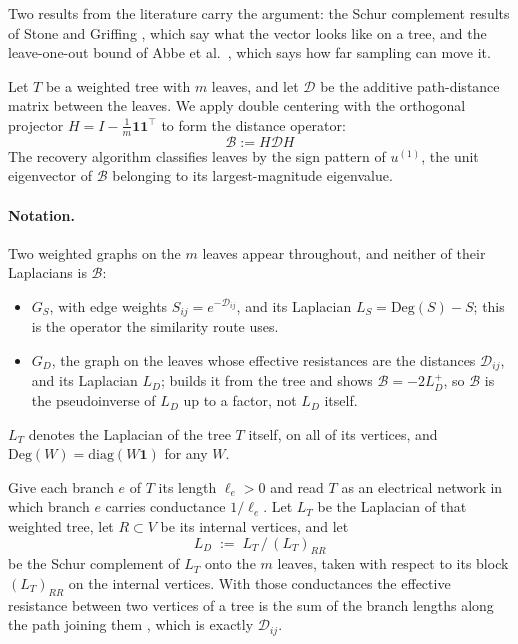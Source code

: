 \documentclass[11pt]{article}
\begin{document}
Two results from the literature carry the argument: the Schur complement results of Stone and Griffing \cite{stone2009fiedler}, which say what the vector looks like on a tree, and the leave-one-out bound of Abbe et al.\ \cite{abbe2020entrywise}, which says how far sampling can move it.

Let $T$ be a weighted tree with $m$ leaves, and let $\mathcal{D}$ be the additive path-distance matrix between the leaves. We apply double centering with the orthogonal projector $H = I - \frac{1}{m}\mathbf{1}\mathbf{1}^\top$ to form the distance operator:
\begin{equation}
\mathcal{B} := H \mathcal{D} H
\end{equation}
The recovery algorithm classifies leaves by the sign pattern of $u^{(1)}$, the unit eigenvector of $\mathcal{B}$ belonging to its largest-magnitude eigenvalue.

\paragraph{Notation.} Two weighted graphs on the $m$ leaves appear throughout, and neither
of their Laplacians is $\mathcal{B}$:
\begin{itemize}
\item $G_S$, with edge weights $S_{ij} = e^{-\mathcal{D}_{ij}}$, and its Laplacian
$L_S = \mathrm{Deg}(S) - S$; this is the operator the similarity route uses.
\item $G_D$, the graph on the leaves whose effective resistances are the distances
$\mathcal{D}_{ij}$, and its Laplacian $L_D$;  builds it from the
tree and shows $\mathcal{B} = -2L_D^{+}$, so $\mathcal{B}$ is the pseudoinverse of $L_D$ up
to a factor, not $L_D$ itself.
\end{itemize}
$L_T$ denotes the Laplacian of the tree $T$ itself, on all of its vertices, and
$\mathrm{Deg}(W) = \mathrm{diag}(W\mathbf{1})$ for any $W$.

Give each branch $e$ of $T$ its length $\ell_e > 0$ and read $T$ as an electrical network
in which branch $e$ carries conductance $1/\ell_e$. Let $L_T$ be the Laplacian of that
weighted tree, let $R \subset V$ be its internal vertices, and let
\begin{equation}
\label{eq:schur}
L_D \;:=\; L_T \,/\, (L_T)_{RR}
\end{equation}
be the Schur complement of $L_T$ onto the $m$ leaves, taken with respect to its block
$(L_T)_{RR}$ on the internal vertices. With those conductances the effective
resistance between two vertices of a tree is the sum of the branch lengths along the path
joining them \cite{klein1993resistance}, which is exactly $\mathcal{D}_{ij}$.
\end{document}
